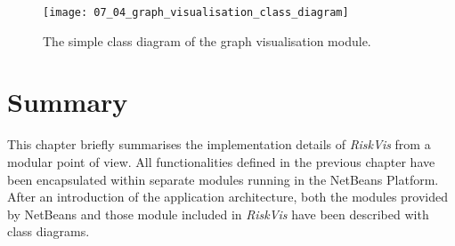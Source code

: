 \begin{figure}[!htb]
  \centering
  \texttt{[image: 07\_04\_graph\_visualisation\_class\_diagram]}
  \caption{The simple class diagram of the graph visualisation module.}
  \label{Figure:07_04}
\end{figure}

\section{Summary}

This chapter briefly summarises the implementation details of \emph{RiskVis} from a modular point of view. All functionalities defined in the previous chapter have been encapsulated within separate modules running in the NetBeans Platform. After an introduction of the application architecture, both the modules provided by NetBeans and those module included in \emph{RiskVis} have been described with class diagrams.
